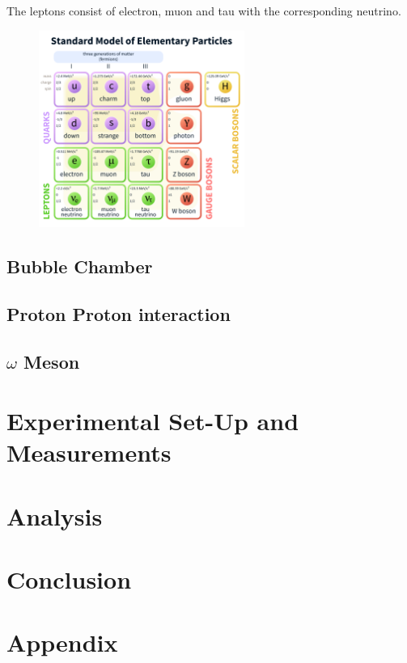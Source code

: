 \documentclass[10pt, a4paper, notitlepage, DIV=15]{scrartcl}
\begin{document}
\newline
The leptons consist of electron, muon and tau with the corresponding neutrino.  
\begin{figure}[h]
	\centering
	\includegraphics[width=0.6\textwidth]{Standard_model.png}
	\caption{}
	\label{fig:standard_model}
\end{figure}
\subsection{Bubble Chamber}
\subsection{Proton Proton interaction}
\subsection{$\omega$ Meson}

\section{Experimental Set-Up and Measurements}

\section{Analysis}

\section{Conclusion}

\section{Appendix}
\end{document}
